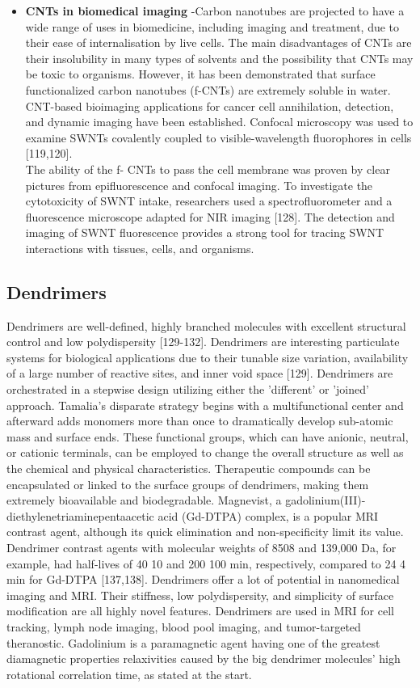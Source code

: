 \documentclass[12pt]{article}
\begin{document}
\begin{itemize}
    \item \textbf{CNTs in biomedical imaging } -Carbon nanotubes are projected to have a wide range of uses in biomedicine, including imaging and treatment, due to their ease of internalisation by live cells. The main disadvantages of CNTs are their insolubility in many types of solvents and the possibility that CNTs may be toxic to organisms. However, it has been demonstrated that surface functionalized carbon nanotubes (f-CNTs) are extremely soluble in water. CNT-based bioimaging applications for cancer cell annihilation, detection, and dynamic imaging have been established. Confocal microscopy was used to examine SWNTs covalently coupled to visible-wavelength fluorophores in cells [119,120]. \\The ability of the f- CNTs to pass the cell membrane was proven by clear pictures from epifluorescence and confocal imaging. To investigate the cytotoxicity of SWNT intake, researchers used a spectrofluorometer and a fluorescence microscope adapted for NIR imaging [128]. The detection and imaging of SWNT fluorescence provides a strong tool for tracing SWNT interactions with tissues, cells, and organisms.
\end{itemize}

\subsection*{Dendrimers}
Dendrimers are well-defined, highly branched molecules with excellent structural control and low polydispersity [129-132]. Dendrimers are interesting particulate systems for biological applications due to their tunable size variation, availability of a large number of reactive sites, and inner void space [129]. Dendrimers are orchestrated in a stepwise design utilizing either the 'different' or 'joined' approach. Tamalia's disparate strategy begins with a multifunctional center and afterward adds monomers more than once to dramatically develop sub-atomic mass and surface ends. These functional groups, which can have anionic, neutral, or cationic terminals, can be employed to change the overall structure as well as the chemical and physical characteristics. Therapeutic compounds can be encapsulated or linked to the surface groups of dendrimers, making them extremely bioavailable and biodegradable.
Magnevist, a gadolinium(III)-diethylenetriaminepentaacetic acid (Gd-DTPA) complex, is a popular MRI contrast agent, although its quick elimination and non-specificity limit its value. Dendrimer contrast agents with molecular weights of 8508 and 139,000 Da, for example, had half-lives of 40 10 and 200 100 min, respectively, compared to 24 4 min for Gd-DTPA [137,138]. Dendrimers offer a lot of potential in nanomedical imaging and MRI. Their stiffness, low polydispersity, and simplicity of surface modification are all highly novel features.
Dendrimers are used in MRI for cell tracking, lymph node imaging, blood pool imaging, and tumor-targeted theranostic. Gadolinium is a paramagnetic agent having one of the greatest diamagnetic properties relaxivities caused by the big dendrimer molecules' high rotational correlation time, as stated at the start.
\end{document}
